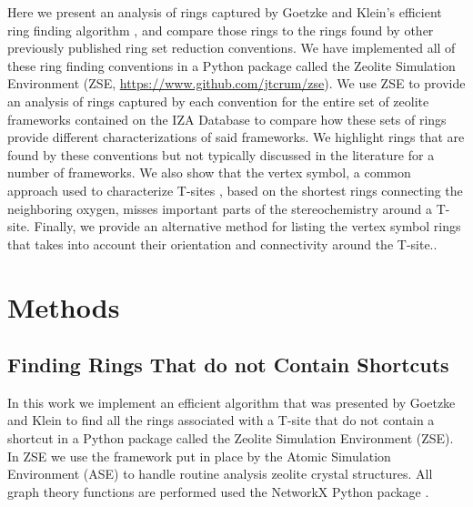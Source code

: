 \documentclass[preprint,numrefs,noinfo,sort&compress]{elsarticle}
\begin{document}
Here we present an analysis of rings captured by Goetzke and Klein's efficient ring finding algorithm \cite{goetzke-properties-1991}, and compare those rings to the rings found by other previously published ring set reduction conventions. We have implemented all of these ring finding conventions in a Python package called the Zeolite Simulation Environment (ZSE, \url{https://www.github.com/jtcrum/zse}). We use ZSE to provide an analysis of rings captured by each convention for the entire set of zeolite frameworks contained on the IZA Database \cite{baerlocher-database-nodate} to compare how these sets of rings provide different characterizations of said frameworks. We highlight rings that are found by these conventions but not typically discussed in the literature for a number of frameworks. We also show that the vertex symbol, a common approach used to characterize T-sites \cite{okeeffe-vertex-1997}, based on the shortest rings connecting the neighboring oxygen, misses important parts of the stereochemistry around a T-site. Finally, we provide an alternative method for listing the vertex symbol rings that takes into account their orientation and connectivity around the T-site.. 

\section{Methods}
\label{sec:org6431034}

\subsection{Finding Rings That do not Contain Shortcuts \label{section:goetzke}}
\label{sec:org42ddcba}

In this work we implement an efficient algorithm that was presented by Goetzke and Klein to find all the rings associated with a T-site that do not contain a shortcut \cite{goetzke-properties-1991} in a Python package called the Zeolite Simulation Environment (ZSE). In ZSE we use the framework put in place by the Atomic Simulation Environment (ASE) \cite{hjorth-larsen-atomic-2017} to handle routine analysis zeolite crystal structures. All graph theory functions are performed used the NetworkX Python package \cite{hagberg-exploring-2008}. 
\end{document}
